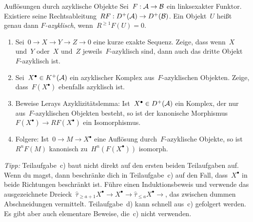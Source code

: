\documentclass{uebblatt}
\begin{document}
\begin{aufgabe}{Auflösungen durch azyklische Objekte}
Sei~$F : \mathcal{A} \to \mathcal{B}$ ein linksexakter Funktor. Existiere seine
Rechtsableitung~$RF : D^+(\mathcal{A}) \to D^+(\mathcal{B})$. Ein Objekt~$U$ heißt genau dann
\emph{$F$-azyklisch}, wenn~$R^{\geq 1}F(U) = 0$.
\begin{enumerate}
\item Sei~$0 \to X \to Y \to Z \to 0$ eine kurze exakte Sequenz. Zeige, dass
wenn~$X$ und~$Y$ oder~$X$ und~$Z$ jeweils~$F$-azyklisch sind, dann auch das
dritte Objekt~$F$-azyklisch ist.
\item Sei~$X^\bullet \in K^+(\mathcal{A})$ ein azyklischer Komplex aus~$F$-azyklischen
Objekten. Zeige, dass~$F(X^\bullet)$ ebenfalls azyklisch ist.
\item Beweise Lerays Azyklizitätslemma: Ist~$X^\bullet \in D^+(\mathcal{A})$ ein Komplex, der nur
aus~$F$-azyklischen Objekten besteht, so ist der kanonische
Morphismus~$F(X^\bullet) \to RF(X^\bullet)$ ein Isomorphismus.
\item Folgere: Ist~$0 \to M \to X^\bullet$ eine Auflösung durch~$F$-azyklische
Objekte, so ist~$R^nF(M)$ kanonisch zu~$H^n(F(X^\bullet))$ isomorph.
\end{enumerate}

{\tiny\emph{Tipp:} Teilaufgabe~c) baut nicht direkt auf den ersten beiden
Teilaufgaben auf. Wenn du magst, dann beschränke dich in Teilaufgabe~c) auf den Fall,
dass~$X^\bullet$ in beide Richtungen beschränkt ist. Führe einen
Induktionsbeweis und verwende das ausgezeichnete Dreieck~$\hat\tau_{\geq a+1}
X^\bullet \to X^\bullet \to \hat\tau_{\leq a} X^\bullet \to$, das zwischen
dummen Abschneidungen vermittelt. Teilaufgabe~d) kann schnell aus~c) gefolgert
werden. Es gibt aber auch elementare Beweise, die~c) nicht verwenden.\par}
\end{aufgabe}
\end{document}
